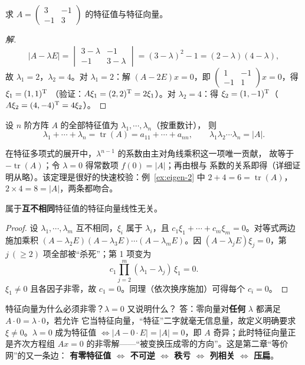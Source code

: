 \begin{example}\label{ex:eigen-2}
求 $A=\begin{pmatrix} 3 & -1 \\ -1 & 3 \end{pmatrix}$ 的特征值与特征向量。
\end{example}
\begin{proof}[解]
\[
  |A-\lambda E|=\begin{vmatrix} 3-\lambda & -1 \\ -1 & 3-\lambda \end{vmatrix}
  =(3-\lambda)^2-1=(2-\lambda)(4-\lambda),
\]
故 $\lambda_1=2$，$\lambda_2=4$。对 $\lambda_1=2$：解 $(A-2E)x=0$，即
$\begin{pmatrix} 1 & -1 \\ -1 & 1 \end{pmatrix}x=0$，得 $\xi_1=(1,1)^{\mathrm{T}}$
（验证：$A\xi_1=(2,2)^{\mathrm{T}}=2\xi_1$）。对 $\lambda_2=4$：得
$\xi_2=(1,-1)^{\mathrm{T}}$（$A\xi_2=(4,-4)^{\mathrm{T}}=4\xi_2$）。
\end{proof}

\begin{theorem}\label{thm:eigen-sum-product}
设 $n$ 阶方阵 $A$ 的全部特征值为 $\lambda_1,\cdots,\lambda_n$（按重数计），
则
\[
  \lambda_1+\cdots+\lambda_n=\operatorname{tr}(A)=a_{11}+\cdots+a_{nn},
  \qquad
  \lambda_1\lambda_2\cdots\lambda_n=|A|.
\]
\end{theorem}

在特征多项式的展开中，$\lambda^{n-1}$ 的系数由主对角线乘积这一项唯一贡献，
故等于 $-\operatorname{tr}(A)$；令 $\lambda=0$ 得常数项 $f(0)=|A|$；再由根与
系数的关系即得（详细证明从略）。该定理是很好的快速校验：例~\ref{ex:eigen-2}
中 $2+4=6=\operatorname{tr}(A)$，$2\times4=8=|A|$，两条都吻合。

\begin{theorem}\label{thm:distinct-independent}
属于\textbf{互不相同}特征值的特征向量线性无关。
\end{theorem}
\begin{proof}
设 $\lambda_1,\cdots,\lambda_m$ 互不相同，$\xi_i$ 属于 $\lambda_i$，且
$c_1\xi_1+\cdots+c_m\xi_m=0$。对等式两边施加乘积
$(A-\lambda_2E)(A-\lambda_3E)\cdots(A-\lambda_mE)$。因
$(A-\lambda_jE)\xi_j=0$，第 $j\ ( \ge2)$ 项全部被“杀死”；第 1 项变为
\[
  c_1\prod_{j=2}^{m}(\lambda_1-\lambda_j)\,\xi_1=0 .
\]
$\xi_1\neq0$ 且各因子非零，故 $c_1=0$。同理（依次换序施加）可得每个
$c_i=0$。
\end{proof}

\begin{qa}{特征向量为什么必须非零？$\lambda=0$ 又说明什么？}
答：零向量对\textbf{任何} $\lambda$ 都满足 $A\cdot0=\lambda\cdot0$，若允许
它当特征向量，“特征”二字就毫无信息量，故定义明确要求 $\xi\neq0$。$\lambda=0$
成为特征值 $\iff|A-0\cdot E|=|A|=0$，即 $A$ 奇异；此时特征向量正是齐次方程组
$Ax=0$ 的非零解——“被变换压成零的方向”。这是第二章“等价网”的又一条边：
\textbf{有零特征值 $\iff$ 不可逆 $\iff$ 秩亏 $\iff$ 列相关 $\iff$ 压扁}。
\end{qa}

